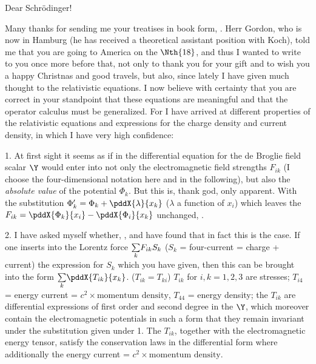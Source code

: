 \date{December 12, 1926}

Dear Schr\"odinger!

Many thanks for sending me your treatises in book form, . Herr Gordon, who is now in Hamburg (he has received a theoretical assistant position with Koch), told me that you are going to America on the $\Nth{18}$, and thus I wanted to write to you once more before that, not only to thank you for your gift and to wish you a happy Christnas and good travels, but also, since lately I have given much thought to the relativistic equations. I now believe with certainty that you are correct in your standpoint that these equations are meaningful and that the operator calculus must be generalized. For I have arrived at different properties of the relativistic equations and expressions for the charge density and current density, in which I have very high confidence:

1. At first sight it seems as if in the differential equation for the de Broglie field scalar $\Y$ would enter into not only the electromagnetic field strengths $F_{ik}$ (I choose the four-dimensional notation here and in the following), but also the \textit{absolute value} of the potential $\Phi_k$. But this is, thank god, only apparent. With the substitution $\Phi'_k = \Phi_k + \pddX{\lambda}{x_k}$ ($\lambda$ a function of $x_i$) which leaves the $F_{ik} = \pddX{\Phi_k}{x_i} - \pddX{\Phi_i}{x_k}$ unchanged, .

2. I have asked myself whether, , and have found that in fact this is the case. If one inserts into the Lorentz force $\underset{k}{\sum}F_{ik}S_k$ ($S_k$ = four-current = charge + current) the expression for $S_k$ which you have given, then this can be brought into the form $\sumX{k}\pddX{T_{ik}}{x_k}$. ($T_{ik} = T_{ki}$) $T_{ik}$ for $i,k=1,2,3$ are stresses; $T_{i4}$ = energy current = $c^2\times\text{momentum density}$, $T_{44}$ = energy density; the $T_{ik}$ are differential expressions of first order and second degree in the $\Y$, which moreover contain the electromagnetic potentials in such a form that they remain invariant under the substitution given under 1. The $T_{ik}$, together with the electromagnetic energy tensor, satisfy the conservation laws in the differential form
where additionally the energy current = $c^2 \times\text{momentum density}$.

